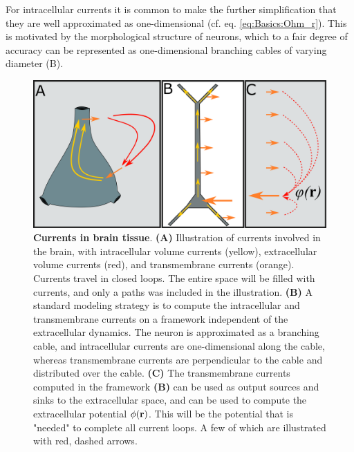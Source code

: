 For intracellular currents it is common to make the further simplification that they are well approximated as one-dimensional (cf. eq. \ref{eq:Basics:Ohm_r}). This is motivated by the morphological structure of neurons, which to a fair degree of accuracy can be represented as one-dimensional branching cables of varying diameter (B). 

\begin{figure}[!ht]
\begin{center}
\includegraphics[width=1.0\textwidth]{Figures/Basics/Twostep.png}
\end{center}
\caption{{\bf Currents in brain tissue}. {\bf(A)} Illustration of currents involved in the brain, with intracellular volume currents (yellow), extracellular volume currents (red), and transmembrane currents (orange). Currents travel in closed loops. The entire space will be filled with currents, and only a paths was included in the illustration. {\bf(B)} A standard modeling strategy is to compute the intracellular and transmembrane currents on a framework independent of the extracellular dynamics. The neuron is approximated as a branching cable, and intracellular currents are one-dimensional along the cable, whereas transmembrane currents are perpendicular to the cable and distributed over the cable. {\bf(C)} The transmembrane currents computed in the framework {\bf(B)} can be used as output sources and sinks to the extracellular space, and can be used to compute the extracellular potential $\phi({\bf r})$. This will be the potential that is "needed" to complete all current loops. A few of which are illustrated with red, dashed arrows. 
}
\label{fig:Basics:Twostep}
\end{figure}


